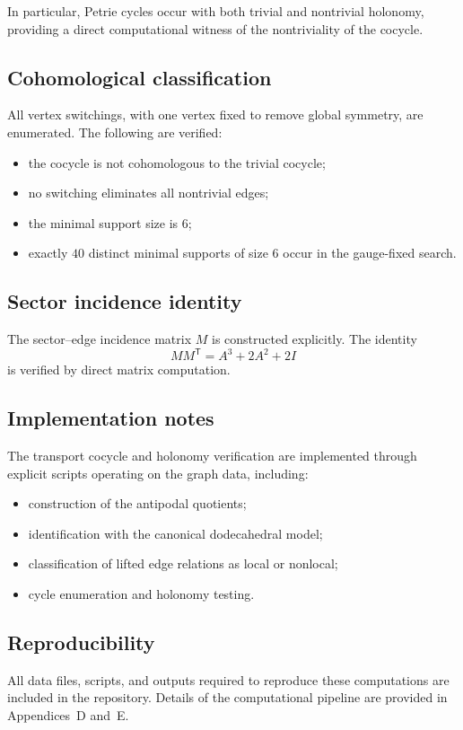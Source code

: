 In particular, Petrie cycles occur with both trivial and nontrivial
holonomy, providing a direct computational witness of the nontriviality
of the cocycle.

\subsection{Cohomological classification}

All vertex switchings, with one vertex fixed to remove global symmetry,
are enumerated. The following are verified:
\begin{itemize}
\item the cocycle is not cohomologous to the trivial cocycle;
\item no switching eliminates all nontrivial edges;
\item the minimal support size is $6$;
\item exactly $40$ distinct minimal supports of size $6$ occur in the
gauge-fixed search.
\end{itemize}

\subsection{Sector incidence identity}

The sector--edge incidence matrix $M$ is constructed explicitly. The identity
\[
M M^{\mathsf T} = A^3 + 2A^2 + 2I
\]
is verified by direct matrix computation.

\subsection{Implementation notes}

The transport cocycle and holonomy verification are implemented through
explicit scripts operating on the graph data, including:

\begin{itemize}
\item construction of the antipodal quotients;
\item identification with the canonical dodecahedral model;
\item classification of lifted edge relations as local or nonlocal;
\item cycle enumeration and holonomy testing.
\end{itemize}

\subsection{Reproducibility}

All data files, scripts, and outputs required to reproduce these
computations are included in the repository. Details of the
computational pipeline are provided in Appendices~D and~E.
